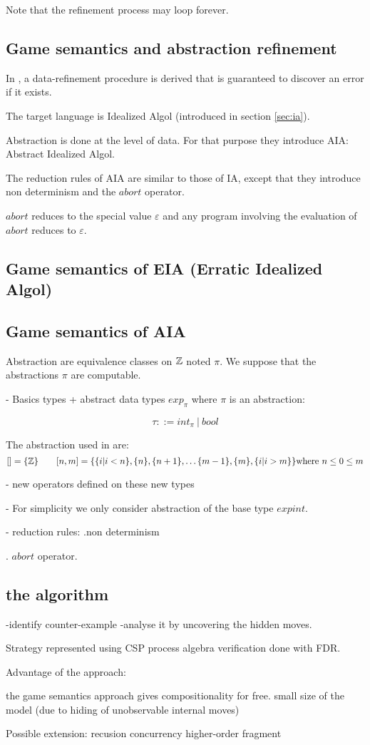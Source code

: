Note that the refinement process may loop forever.


\subsection{Game semantics and abstraction refinement}
In \citep{DBLP:conf/sas/DimovskiGL05}, a data-refinement procedure
is derived that is guaranteed to discover an error if it exists.

The target language is Idealized Algol (introduced in section
\ref{sec:ia}).

Abstraction is done at the level of data. For that purpose they
introduce AIA: Abstract Idealized Algol.

The reduction rules of AIA are similar to those of IA, except that
they introduce non determinism and the $abort$ operator.

$abort$ reduces to the special value $\varepsilon$ and any program
involving the evaluation of $abort$ reduces to $\varepsilon$.


\subsection{Game semantics of EIA (Erratic Idealized Algol)}
\todo
\subsection{Game semantics of AIA}
Abstraction are equivalence classes on $\mathbb{Z}$ noted $\pi$. We
suppose that the abstractions $\pi$ are computable.

- Basics types + abstract data types $exp_\pi$ where $\pi$ is an
abstraction:

$$ \tau ::= int_\pi\ |\ bool$$

The abstraction used in \cite{DBLP:conf/sas/DimovskiGL05} are:
$$ [] = \{ \mathbb{Z} \} \qquad [n,m] = \{ \{ i | i<n \}, \{ n \}, \{n+1\},
\ldots \{ m-1\}, \{ m\}, \{ i | i > m \} \} \mbox{where } n \leq 0
\leq m$$


- new operators defined on these new types

- For simplicity we only consider abstraction of the base type
$expint$.

- reduction rules:
.non determinism

. $abort$ operator.






\subsection{the algorithm}
\todo -identify counter-example -analyse it by uncovering the hidden
moves.

Strategy represented using CSP process algebra verification done
with FDR.



Advantage of the approach:

the game semantics approach gives compositionality for free. small
size of the model (due to hiding of unobservable internal moves)



Possible extension:
recusion
concurrency
higher-order fragment
